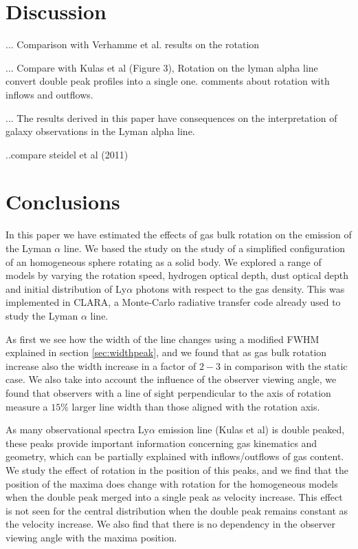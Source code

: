 \documentclass[usenatbib]{mn2e}
\begin{document}
\section{Discussion}
\label{sec:discussion}

... Comparison with Verhamme et al. results on the rotation


... Compare with Kulas et al (Figure 3), Rotation on the lyman alpha
line convert double peak profiles into a single one. comments about
rotation with inflows and outflows.   

... The results derived in this paper have consequences on the
interpretation of galaxy observations in the Lyman alpha line.

..compare steidel et al (2011) 





\section{Conclusions}
In this paper we have estimated the effects of gas bulk rotation on
the emission  of the Lyman $\alpha$ line. We based the study on the
study of a simplified configuration of an homogeneous sphere rotating
as a solid body. We explored  a range of models by varying the
rotation speed, hydrogen optical depth, dust optical depth and initial
distribution of Ly$\alpha$ photons with respect to the gas
density. This was implemented in CLARA, a Monte-Carlo
radiative transfer code already used to study the Lyman $\alpha$
line. 

As first we see how the width of the line changes using a modified FWHM
explained in section \ref{sec:widthpeak}, and we found that as gas bulk 
rotation increase also the width increase in a factor of $2-3$ in comparison 
with the static case. We also take into account the influence of the observer 
viewing angle, we found that observers with a line of sight perpendicular  
to the axis of rotation measure a $15\%$ larger line width than those 
aligned with the rotation axis.

As many observational spectra Ly$\alpha$ emission line (Kulas et al)
is double  peaked, these peaks provide important information
concerning gas kinematics and geometry,  which can be partially
explained with inflows/outflows of gas content.  We study the effect
of rotation in the position of this peaks, and we find  that the
position of the maxima does change with rotation for the homogeneous
models when the double peak merged into a single peak as velocity
increase. This effect is not seen for the central distribution when
the double peak  remains constant as the velocity increase. We also
find that there is no dependency in the observer viewing angle with
the maxima position. 
\end{document}
